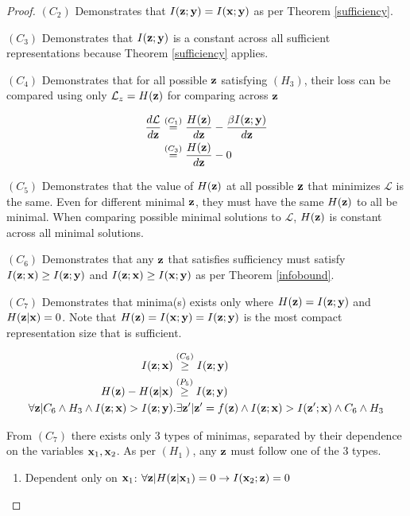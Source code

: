 \begin{theorem}
\begin{proof}
$(C_2)$ Demonstrates that $I({\mathbf{z}}; {\mathbf{y}}) = I({\mathbf{x}}; {\mathbf{y}})$ as per Theorem \ref{sufficiency}.

$(C_3)$ Demonstrates that $I({\mathbf{z}}; {\mathbf{y}})$ is a constant across all sufficient representations because Theorem \ref{sufficiency} applies.

$(C_4)$ Demonstrates that for all possible ${\mathbf{z}}$ satisfying $(H_3)$, their loss can be compared using only $\mathcal{L}_z = H({\mathbf{z}})$ for comparing across ${\mathbf{z}}$

$$
\begin{aligned}
\frac{d\mathcal{L}}{d{\mathbf{z}}}  &\stackrel{\left(C_1\right)}{=}\frac{H({\mathbf{z}})}{d{\mathbf{z}}} - \frac{\beta I({\mathbf{z}}; {\mathbf{y}})}{d{\mathbf{z}}} \\
&\stackrel{\left(C_3\right)}{=}\frac{H({\mathbf{z}})}{d{\mathbf{z}}} - 0
\end{aligned}
$$

$(C_5)$ Demonstrates that the value of $H({\mathbf{z}})$ at all possible ${\mathbf{z}}$ that minimizes $\mathcal{L}$ is the same. Even for different minimal ${\mathbf{z}}$, they must have the same $H({\mathbf{z}})$ to all be minimal. When comparing possible minimal solutions to $\mathcal{L}$, $H({\mathbf{z}})$ is constant across all minimal solutions.

$(C_6)$ Demonstrates that any ${\mathbf{z}}$ that satisfies sufficiency must satisfy $I({\mathbf{z}}; {\mathbf{x}}) \geq I({\mathbf{z}}; {\mathbf{y}})$ and $I({\mathbf{z}}; {\mathbf{x}}) \geq I({\mathbf{x}}; {\mathbf{y}})$ as per Theorem \ref{infobound}.

$(C_7)$ Demonstrates that minima(s) exists only where $H({\mathbf{z}}) = I({\mathbf{z}}; {\mathbf{y}})$ and $H({\mathbf{z}}| {\mathbf{x}}) = 0$. Note that $H({\mathbf{z}}) = I({\mathbf{x}}; {\mathbf{y}}) = I({\mathbf{z}}; {\mathbf{y}})$ is the most compact representation size that is sufficient.

$$
\begin{aligned}
I({\mathbf{z}};{\mathbf{x}}) &\stackrel{\left(C_6\right)}{\geq} I({\mathbf{z}}; {\mathbf{y}}) \\
H({\mathbf{z}}) - H({\mathbf{z}}| {\mathbf{x}})  &\stackrel{\left(P_5\right)}{\geq} I({\mathbf{z}}; {\mathbf{y}})\\
\forall {\mathbf{z}} | C_6 \land H_3 \land I({\mathbf{z}}; {\mathbf{x}}) > I({\mathbf{z}}; {\mathbf{y}}) &. \exists {\mathbf{z}}'|{\mathbf{z}}' = f({\mathbf{z}}) \land I({\mathbf{z}}; {\mathbf{x}}) > I({\mathbf{z}}'; {\mathbf{x}}) \land C_6 \land H_3
\end{aligned}
$$

From $(C_7)$ there exists only 3 types of minimas, separated by their dependence on the variables  ${\mathbf{x}}_1, {\mathbf{x}}_2$. As per $(H_1)$, any ${\mathbf{z}}$ must follow one of the 3 types.

\begin{enumerate}
\item Dependent only on ${\mathbf{x}}_1$: $\forall {\mathbf{z}}|H({\mathbf{z}}|{\mathbf{x}}_1)=0 \rightarrow I({\mathbf{x}}_2; {\mathbf{z}}) = 0$


\end{enumerate}
\end{proof}
\end{theorem}

